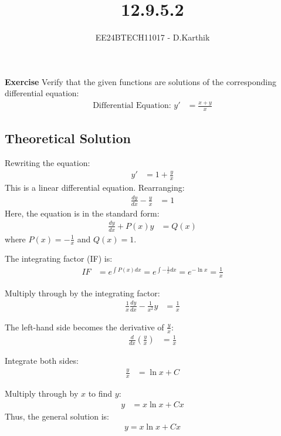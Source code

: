 \documentclass[journal]{IEEEtran}
\begin{document}

\vspace{3cm}
\title{12.9.5.2}
\author{EE24BTECH11017 - D.Karthik}
{\let\newpage\relax\maketitle}
\renewcommand{\thefigure}{\theenumi}
\renewcommand{\thetable}{\theenumi}

\textbf{Exercise} Verify that the given functions are solutions of the corresponding differential equation:
\begin{align}
    \text{Differential Equation: } y' &= \frac{x + y}{x}
\end{align}

\subsection*{Theoretical Solution}

Rewriting the equation:
\begin{align}
    y' &= 1 + \frac{y}{x}
\end{align}
This is a linear differential equation. Rearranging:
\begin{align}
    \frac{dy}{dx} - \frac{y}{x} &= 1
\end{align}
Here, the equation is in the standard form:
\begin{align}
    \frac{dy}{dx} + P(x)y &= Q(x)
\end{align}
where \( P(x) = -\frac{1}{x} \) and \( Q(x) = 1 \).

The integrating factor (IF) is:
\begin{align}
    IF &= e^{\int P(x) dx} = e^{\int -\frac{1}{x} dx} = e^{-\ln x} = \frac{1}{x}
\end{align}

Multiply through by the integrating factor:
\begin{align}
    \frac{1}{x}\frac{dy}{dx} - \frac{1}{x^2}y &= \frac{1}{x}
\end{align}

The left-hand side becomes the derivative of \( \frac{y}{x} \):
\begin{align}
    \frac{d}{dx}\left(\frac{y}{x}\right) &= \frac{1}{x}
\end{align}

Integrate both sides:
\begin{align}
    \frac{y}{x} &= \ln x + C
\end{align}

Multiply through by \( x \) to find \( y \):
\begin{align}
    y &= x\ln x + Cx
\end{align}
Thus, the general solution is:
\begin{align}
    y = x\ln x + Cx
\end{align}
\end{document}
